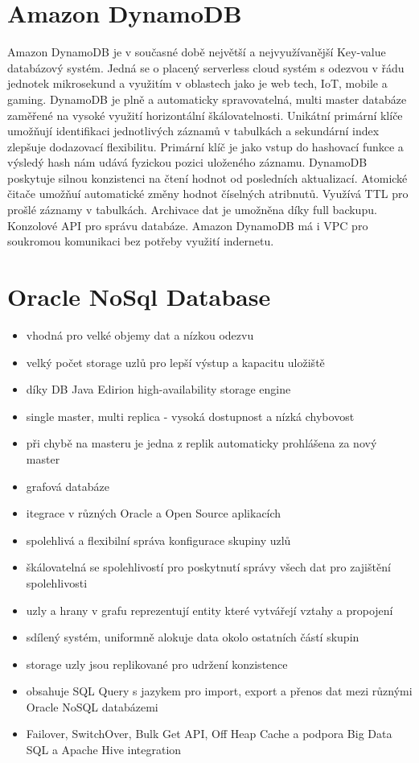 \documentclass[czech,bachelor,dept460,male,csharp,cpdeclaration]{diploma}
\begin{document}
	\section{Amazon DynamoDB}
	
	Amazon DynamoDB\cite{dynamodb} je v současné době největší a nejvyužívanější Key-value databázový systém. Jedná se o placený serverless cloud systém s odezvou v řádu jednotek mikrosekund a využitím v oblastech jako je web tech, IoT, mobile a gaming. DynamoDB je plně a automaticky spravovatelná, multi master databáze zaměřené na vysoké využití horizontální škálovatelnosti. Unikátní primární klíče umožňují identifikaci jednotlivých záznamů v tabulkách a sekundární index zlepšuje dodazovací flexibilitu. Primární klíč je jako vstup do hashovací funkce a výsledý hash nám udává fyzickou pozici uloženého záznamu. DynamoDB poskytuje silnou konzistenci na čtení hodnot od posledních aktualizací. Atomické čitače umožňuí automatické změny hodnot číselných atribnutů. Využívá TTL pro prošlé záznamy v tabulkách. Archivace dat je umožněna díky full backupu. Konzolové API pro správu databáze. Amazon DynamoDB má i VPC pro soukromou komunikaci bez potřeby využití indernetu.
		
	\section{Oracle NoSql Database}
		\begin{itemize}
			\item vhodná pro velké objemy dat a nízkou odezvu
			\item velký počet storage uzlů pro lepší výstup a kapacitu uložiště
			\item díky DB Java Edirion high-availability storage engine
			\item single master, multi replica - vysoká dostupnost a nízká chybovost
			\item při chybě na masteru je jedna z replik automaticky prohlášena za nový master
			\item grafová databáze
			\item itegrace v různých Oracle a Open Source aplikacích
			\item spolehlivá a flexibilní správa konfigurace skupiny uzlů
			\item škálovatelná se spolehlivostí pro poskytnutí správy všech dat pro zajištění spolehlivosti
			\item uzly a hrany v grafu reprezentují entity které vytvářejí vztahy a propojení
			\item sdílený systém, uniformně alokuje data okolo ostatních částí skupin
			\item storage uzly jsou replikované pro udržení konzistence
			\item obsahuje SQL Query s jazykem pro import, export a přenos dat mezi různými Oracle NoSQL databázemi
			\item Failover, SwitchOver, Bulk Get API, Off Heap Cache a podpora Big Data SQL a Apache Hive integration
		\end{itemize}
\end{document}
